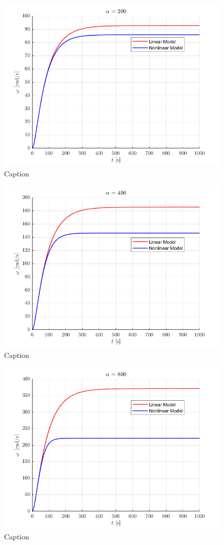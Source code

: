 \documentclass[letterpaper,12pt]{article}
\begin{document}
\begin{figure}[h]
    \centering
    \includegraphics[width = 1\linewidth]{a200.png}
    \caption{Caption}
    \label{fig:my_label}
\end{figure}

\begin{figure}[h]
    \centering
    \includegraphics[width = 1\linewidth]{a400.png}
    \caption{Caption}
    \label{fig:my_label}
\end{figure}

\begin{figure}[h]
    \centering
    \includegraphics[width = 1\linewidth]{a800.png}
    \caption{Caption}
    \label{fig:my_label}
\end{figure}
\end{document}
